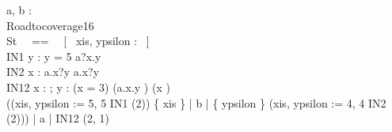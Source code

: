 \begin{circus}
\circchannel a, b : \nat \cross \nat \\
\circprocess Roadtocoverage16 \circdef \circbegin \\
	\circstate St ~~==~~ [~ xis, ypsilon : \nat ~] \\
	IN1 \circdef y : \nat \circspot \lcircguard y = 5 \rcircguard \circguard a?x.y \then \Skip \\
	IN2 \circdef x : \nat \circspot a.x?y \then \Skip \intchoice a.x?y \then \Skip \\
	IN12 \circdef x : \nat ; y : \nat \circspot \circif (x = 3) \circthen (a.x.y \then \Skip) \circelse (x ) \circthen \Skip \circfi \\
	\circspot
	    ((xis, ypsilon := 5, 5 \circseq IN1 (2)) \lpar \{ xis \} | \lchanset b \rchanset | \{ ypsilon \} \rpar (xis, ypsilon := 4, 4 \circseq IN2 (2))) \lpar | \lchanset a \rchanset | \rpar IN12 (2, 1) \\
	\circend
\end{circus}
